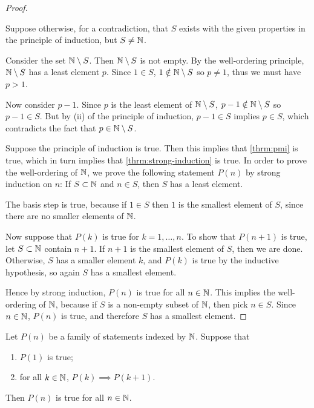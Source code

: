 \begin{proof} \

\fbox{$\implies$} Suppose otherwise, for a contradiction, that $S$ exists with the given properties in the principle of induction, but $S\neq\mathbb N$. 

Consider the set $\mathbb N\setminus S$. Then $\mathbb N\setminus S$ is not empty. By the well-ordering principle, $\mathbb N\setminus S$ has a least element $p$. Since $1\in S$, $1\notin \mathbb N\setminus S$ so $p\neq 1$, thus we must have $p>1$. 

Now consider $p-1$. Since $p$ is the least element of $\mathbb N\setminus S$, $p-1\notin \mathbb N\setminus S$ so $p-1\in S$. But by (ii) of the principle of induction, $p-1\in S$ implies $p\in S$, which contradicts the fact that $p\in\mathbb N\setminus S$.

\fbox{$\impliedby$} Suppose the principle of induction is true. Then this implies that \cref{thrm:pmi} is true, which in turn implies that \cref{thrm:strong-induction} is true. In order to prove the well-ordering of $\mathbb N$, we prove the following statement $P(n)$ by strong induction on $n$: If $S\subset\mathbb N$ and $n\in S$, then $S$ has a least element.

The basis step is true, because if $1\in S$ then $1$ is the smallest element of $S$, since there are no smaller elements of $\mathbb N$.

Now suppose that $P(k)$ is true for $k=1,\dots,n$. To show that $P(n+1)$ is true, let $S\subset\mathbb N$ contain $n+1$. If $n+1$ is the smallest element of $S$, then we are done. Otherwise, $S$ has a smaller element $k$, and $P(k)$ is true by the inductive hypothesis, so again $S$ has a smallest element.

Hence by strong induction, $P(n)$ is true for all $n\in\mathbb N$. This implies the well-ordering of $\mathbb N$, because if $S$ is a non-empty subset of $\mathbb N$, then pick $n\in S$. Since $n\in\mathbb N$, $P(n)$ is true, and therefore $S$ has a smallest element.
\end{proof}

\begin{theorem}\label{thrm:pmi}
Let $P(n)$ be a family of statements indexed by $\mathbb N$. Suppose that 
\begin{enumerate}[label=(\roman*)]
\item $P(1)$ is true;
\item for all $k\in\mathbb N$, $P(k)\implies P(k+1)$.
\end{enumerate}
Then $P(n)$ is true for all $n\in\mathbb N$.
\end{theorem}

